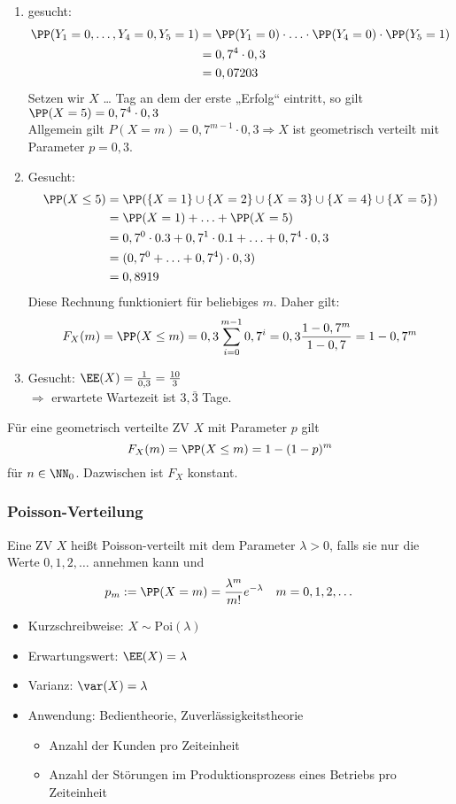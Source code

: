 \documentclass{scrreprt}
\renewenvironment{anumerate}{\begin{enumerate}[label=(\alph*)]}{\end{enumerate}} %
\begin{document}
\begin{anumerate}
\item gesucht: \begin{align*}
\PP(Y_1=0, \ldots, Y_4=0, Y_5=1) &= \PP(Y_1=0) \cdot \ldots \cdot \PP(Y_4=0) \cdot \PP(Y_5=1) \\
&= 0,7 ^4 \cdot 0,3 \\
&= 0,07203
\end{align*}
Setzen wir $X$ … Tag an dem der erste „Erfolg“ eintritt, so gilt $\PP(X=5)=0,7^4\cdot 0,3$\\
Allgemein gilt $P(X=m)=0,7^{m-1}\cdot 0,3 \Rightarrow X$ ist geometrisch verteilt mit Parameter $p=0,3$.
\item Gesucht:
\begin{align*}
\PP(X\leq 5)&=\PP(\{X=1\}\cup \{X=2\} \cup \{X=3\} \cup \{X=4\} \cup \{X=5\}) \\
&= \PP(X=1) + \ldots + \PP(X=5) \\
&= 0,7^0\cdot 0.3 + 0,7^1 \cdot 0.1 + \ldots + 0,7^4 \cdot 0,3 \\
&= (0,7^0+\ldots+0,7^4)\cdot 0,3 ) \\
&= 0,8919
\end{align*}
Diese Rechnung funktioniert für beliebiges $m$. Daher gilt: 
$$F_X(m)=\PP(X\leq m) = 0,3 \sum_{i=0}^{m-1}0,7^i=0,3 \frac{1-0,7^m}{1-0,7}=1-0,7^m$$
\item Gesucht: $\EE(X)=\frac{1}{0,3}=\frac{10}{3}$\\
$\Rightarrow$ erwartete Wartezeit ist $3,\bar{3}$ Tage.
\end{anumerate}

 Für eine geometrisch verteilte ZV $X$ mit Parameter $p$ gilt 
$$F_X(m)=\PP(X\leq m) = 1-(1-p)^m$$
für $n \in \NN_0$. Dazwischen ist $F_X$ konstant.

\subsubsection{Poisson-Verteilung}
 Eine ZV $X$ heißt Poisson-verteilt mit dem Parameter $\lambda >0$, falls sie nur die Werte $0,1,2,\dots$ annehmen kann und 
$$p_m:=\PP(X=m)=\frac{\lambda^m}{m!}e^{-\lambda} \quad m=0,1,2,\dots$$
\begin{itemize}
\item Kurzschreibweise: $X\sim \mathrm{Poi}(\lambda)$
\item Erwartungswert: $\EE(X)=\lambda$
\item Varianz: $\var(X)=\lambda$
\item Anwendung: Bedientheorie, Zuverlässigkeitstheorie
\begin{itemize}
\item Anzahl der Kunden pro Zeiteinheit
\item Anzahl der Störungen im Produktionsprozess eines Betriebs pro Zeiteinheit
\end{itemize}
\end{itemize}
\end{document}
